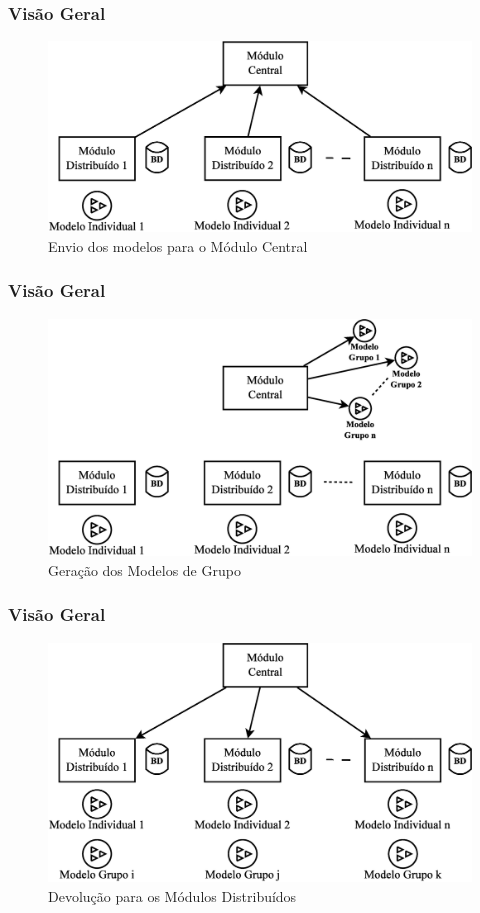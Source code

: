 \documentclass[hyperref={pdfpagelabels=false}]{beamer}
\begin{document}
\begin{frame}
	\frametitle{Visão Geral}
    \begin{figure}
		\centering
	    \includegraphics[scale=0.30]{img/VisaoGeral-02}
  		\caption{\scriptsize{Envio dos modelos para o Módulo Central}}
   	\end{figure}
\end{frame}

\begin{frame}
	\frametitle{Visão Geral}
    \begin{figure}
		\centering
	    \includegraphics[scale=0.30]{img/VisaoGeral-03}
  		\caption{\scriptsize{Geração dos Modelos de Grupo}}
   	\end{figure}
\end{frame}

\begin{frame}
	\frametitle{Visão Geral}
    \begin{figure}
		\centering
	    \includegraphics[scale=0.30]{img/VisaoGeral-04}
  		\caption{\scriptsize{Devolução para os Módulos Distribuídos}}
   	\end{figure}
\end{frame}
\end{document}
